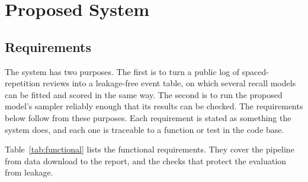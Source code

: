 \chapter{Proposed System}
\label{ch:design}

\section{Requirements}
\label{sec:design-requirements}

The system has two purposes. The first is to turn a public log of spaced-repetition reviews into a
leakage-free event table, on which several recall models can be fitted and scored in the same way. The second
is to run the proposed model's sampler reliably enough that its results can be checked. The requirements below
follow from these purposes. Each requirement is stated as something the system does, and each one is traceable
to a function or test in the code base.

Table~\ref{tab:functional} lists the functional requirements. They cover the pipeline from data download to the
report, and the checks that protect the evaluation from leakage.

